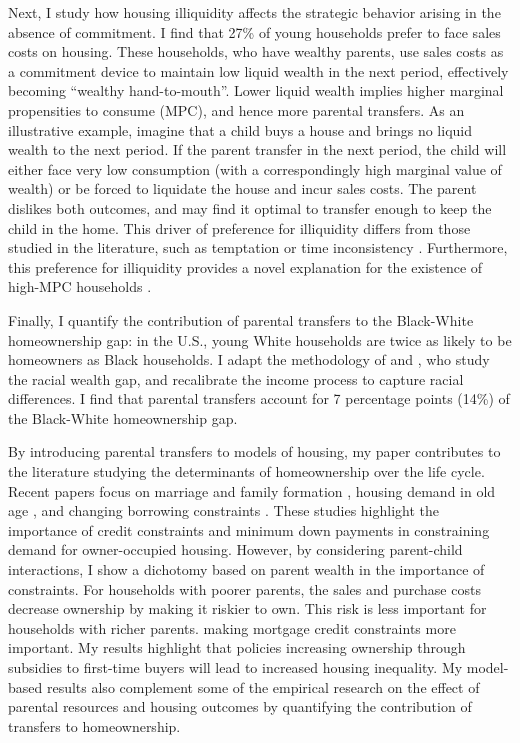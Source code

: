 \documentclass[12pt]{article}
\begin{document}
Next, I study how housing illiquidity affects the strategic behavior arising in the absence of commitment. I find that 27\% of young households prefer to face sales costs on housing. These households, who have wealthy parents, use sales costs as a commitment device to maintain low liquid wealth in the next period, effectively becoming ``wealthy hand-to-mouth''. Lower liquid wealth implies higher marginal propensities to consume (MPC), and hence more parental transfers. As an illustrative example, imagine that a child buys a house and brings no liquid wealth to the next period. If the parent transfer in the next period, the child will either face very low consumption (with a correspondingly high marginal value of wealth) or be forced to liquidate the house and incur sales costs. The parent dislikes both outcomes, and may find it optimal to transfer enough to keep the child in the home. This driver of preference for illiquidity differs from those studied in the literature, such as temptation or time inconsistency \citep{attanasio2024temptation,laibson1997golden}. Furthermore, this preference for illiquidity provides a novel explanation for the existence of high-MPC households \cite[see e.g.,][]{kaplan2022marginal}. 

Finally, I quantify the contribution of parental transfers to the Black-White homeownership gap: in the U.S., young White households are twice as likely to be homeowners as Black households. I adapt the methodology of \cite{Ashman2020} and \cite{aliprantis2022dynamics}, who study the racial wealth gap, and recalibrate the income process to capture racial differences.  I find that parental transfers account for 7 percentage points (14\%) of the Black-White homeownership gap. 




By introducing parental transfers to models of housing, my paper contributes to the literature studying the determinants of homeownership over the life cycle. Recent papers focus on marriage and family formation \citep{Fisher2011,Chang2024,Khorunzhina2019}, housing demand in old age \citep{McGee2019,Barczyk2020a}, and changing borrowing constraints \citep{Paz-Pardo2019,Mabille2020}. These studies highlight the importance of credit constraints and minimum down payments in constraining demand for owner-occupied housing. However, by considering parent-child interactions, I show a dichotomy based on parent wealth in the importance of constraints. For households with poorer parents, the sales and purchase costs decrease ownership by making it riskier to own. This risk is less important for households with richer parents. making mortgage credit constraints more important. My results highlight  that policies increasing ownership through subsidies to first-time buyers will lead to increased housing inequality. My model-based results also complement some of the empirical research on the effect of parental resources and housing outcomes \citep[see e.g.,][ for recent work]{wold2024housing,daysal2023intergenerational,benetton2022dynastic} by quantifying the contribution of transfers to homeownership.
\end{document}
